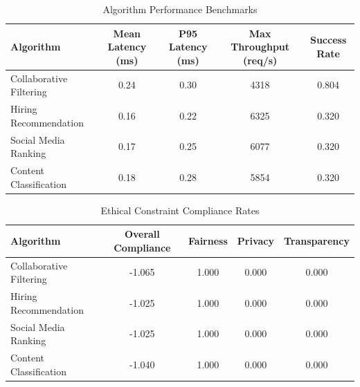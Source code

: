 \begin{table}[htbp]
\centering
\caption{Algorithm Performance Benchmarks}
\label{tab:performance}
\begin{tabular}{lcccc}
\toprule
Algorithm & Mean Latency (ms) & P95 Latency (ms) & Max Throughput (req/s) & Success Rate \\
\midrule
Collaborative Filtering & 0.24 & 0.30 & 4318 & 0.804 \\
Hiring Recommendation & 0.16 & 0.22 & 6325 & 0.320 \\
Social Media Ranking & 0.17 & 0.25 & 6077 & 0.320 \\
Content Classification & 0.18 & 0.28 & 5854 & 0.320 \\
\bottomrule
\end{tabular}
\end{table}

\begin{table}[htbp]
\centering
\caption{Ethical Constraint Compliance Rates}
\label{tab:compliance}
\begin{tabular}{lcccc}
\toprule
Algorithm & Overall Compliance & Fairness & Privacy & Transparency \\
\midrule
Collaborative Filtering & -1.065 & 1.000 & 0.000 & 0.000 \\
Hiring Recommendation & -1.025 & 1.000 & 0.000 & 0.000 \\
Social Media Ranking & -1.025 & 1.000 & 0.000 & 0.000 \\
Content Classification & -1.040 & 1.000 & 0.000 & 0.000 \\
\bottomrule
\end{tabular}
\end{table}
